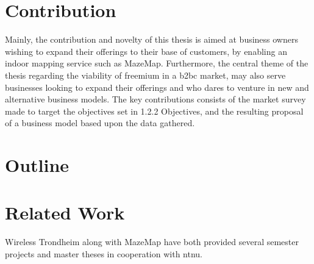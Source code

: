 \section{Contribution}
Mainly, the contribution and novelty of this thesis is aimed at business owners wishing to expand their offerings to their base of customers, by enabling an indoor mapping service such as MazeMap. Furthermore, the central theme of the thesis regarding the viability of freemium in a \gls{b2bc} market, may also serve businesses looking to expand their offerings and who dares to venture in new and alternative business models. The key contributions consists of the market survey made to target the objectives set in 1.2.2 Objectives, and the resulting proposal of a business model based upon the data gathered.   
\section{Outline}

\section{Related Work}
Wireless Trondheim along with MazeMap have both provided several semester projects and master theses in cooperation with \gls{ntnu}.